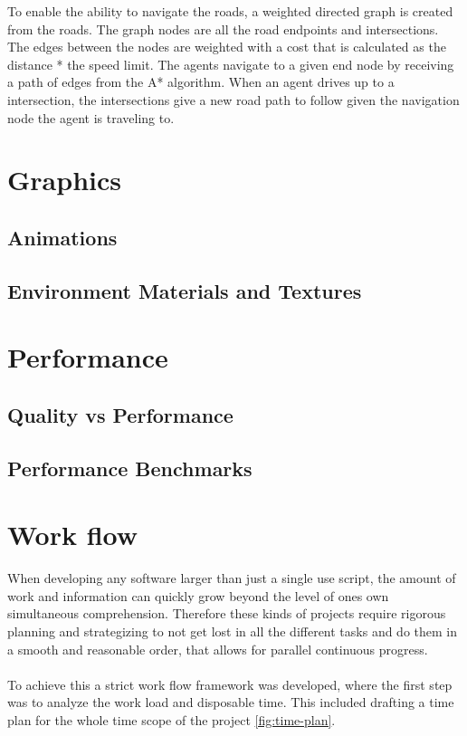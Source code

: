 To enable the ability to navigate the roads, a weighted directed graph is created from the roads.
The graph nodes are all the road endpoints and intersections. The edges between the nodes are weighted with a cost that is calculated as the distance * the speed limit.
The agents navigate to a given end node by receiving a path of edges from the A* algorithm. When an agent drives up to a intersection, the intersections give a new road path to follow given the navigation node the agent is traveling to.


\section{Graphics}

\subsection{Animations}

\subsection{Environment Materials and Textures}



\section{Performance}

\subsection{Quality vs Performance}

\subsection{Performance Benchmarks}


\section{Work flow}
When developing any software larger than just a single use script, the amount of work and information can quickly grow beyond the level of ones own simultaneous comprehension. Therefore these kinds of projects require rigorous planning and strategizing to not get lost in all the different tasks and do them in a smooth and reasonable order, that allows for parallel continuous progress.
\\\\
To achieve this a strict work flow framework was developed, where the first step was to analyze the work load and disposable time. This included drafting a time plan for the whole time scope of the project \ref{fig:time-plan}. 


